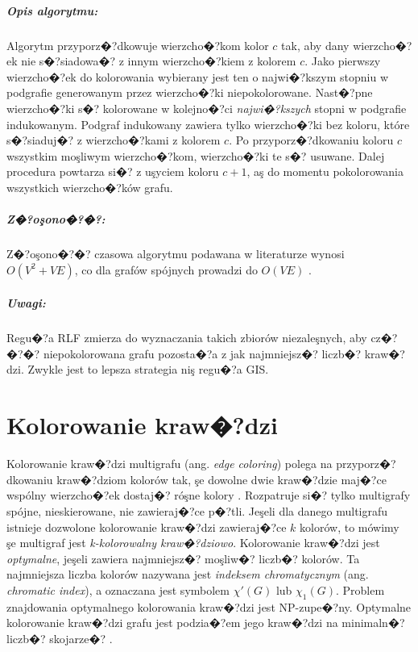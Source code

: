 \documentclass[12pt,a4paper]{mwrep}
\begin{document}
\paragraph{Opis algorytmu:} Algorytm przyporz�?dkowuje wierzcho�?kom
kolor $c$ tak, aby dany wierzcho�?ek nie s�?siadowa�? z innym wierzcho�?kiem
z kolorem $c$. Jako pierwszy wierzcho�?ek do kolorowania wybierany
jest ten o najwi�?kszym stopniu w podgrafie generowanym
przez wierzcho�?ki niepokolorowane. Nast�?pne
wierzcho�?ki s�? kolorowane w kolejno�?ci \emph{najwi�?kszych}
stopni w podgrafie indukowanym. 
Podgraf indukowany zawiera tylko wierzcho�?ki bez koloru, 
które s�?siaduj�? z wierzcho�?kami z kolorem $c$.
Po przyporz�?dkowaniu koloru $c$ wszystkim moşliwym wierzcho�?kom, 
wierzcho�?ki te s�? usuwane.
Dalej procedura powtarza si�? z uşyciem koloru $c+1$, aş do momentu 
pokolorowania wszystkich wierzcho�?ków grafu.

\paragraph{Z�?oşono�?�?:} Z�?oşono�?�? czasowa algorytmu podawana w literaturze
wynosi $O(V^2 + VE)$, co dla grafów spójnych prowadzi do $O(VE)$
\cite{Wojciechowski}.

\paragraph{Uwagi:} Regu�?a RLF zmierza do wyznaczania takich zbiorów 
niezaleşnych, aby cz�?�?�? niepokolorowana grafu pozosta�?a 
z jak najmniejsz�? liczb�? kraw�?dzi. 
Zwykle jest to lepsza strategia niş regu�?a GIS.






\chapter{Kolorowanie kraw�?dzi}
\label{ch:kolorowanie_krawedzi}

Kolorowanie kraw�?dzi multigrafu (ang. \emph{edge coloring})
polega na przyporz�?dkowaniu
kraw�?dziom kolorów tak, şe dowolne dwie kraw�?dzie maj�?ce
wspólny wierzcho�?ek dostaj�? róşne kolory
\cite{wiki_edge_coloring}.
Rozpatruje si�? tylko multigrafy spójne, nieskierowane,
nie zawieraj�?ce p�?tli.
Jeşeli dla danego multigrafu istnieje dozwolone kolorowanie kraw�?dzi
zawieraj�?ce $k$ kolorów, to mówimy şe multigraf jest
\emph{k-kolorowalny kraw�?dziowo}.
Kolorowanie kraw�?dzi jest \emph{optymalne}, jeşeli zawiera
najmniejsz�? moşliw�? liczb�? kolorów.
Ta najmniejsza liczba kolorów nazywana jest
\emph{indeksem chromatycznym} (ang. \emph{chromatic index}), 
a oznaczana jest symbolem $\chi'(G)$ lub $\chi_1(G)$.
Problem znajdowania optymalnego kolorowania kraw�?dzi jest NP-zupe�?ny.
Optymalne kolorowanie kraw�?dzi grafu jest podzia�?em
jego kraw�?dzi na minimaln�? liczb�? skojarze�?
\cite{Wojciechowski}.
\end{document}

